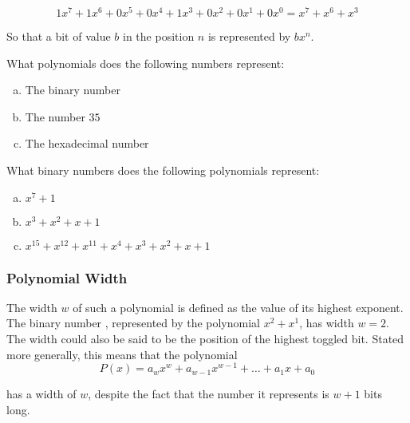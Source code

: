 \begin{equation*}
  1x^7 + 1x^6 + 0x^5 + 0x^4 + 1x^3 + 0x^2 + 0x^1 + 0x^0 = x^7 + x^6 + x^3
\end{equation*}

So that a bit of value $b$ in the position $n$ is represented by
$bx^n$.

\begin{Exercise}[label={bin-to-poly}]

  What polynomials does the following numbers represent:

  \begin{enumerate}[(a)]
  \item The binary number 
  \item The number $35$
  \item The hexadecimal number 
  \end{enumerate}

\end{Exercise}

\begin{Exercise}[label={poly-to-bin}]

  What binary numbers does the following polynomials represent:

  \begin{enumerate}[(a)]
  \item $x^7 + 1$
  \item $x^3 + x^2 + x + 1$
  \item $x^{15} + x^{12} + x^{11} + x^4 + x^3 + x^2 + x + 1$
  \end{enumerate}

\end{Exercise}

\subsubsection{Polynomial Width}

The width $w$ of such a polynomial is defined as the value of its
highest exponent. The binary number , represented by the
polynomial $x^2 + x^1$, has width $w=2$. The width could also be said to
be the position of the highest toggled bit. Stated more generally,
this means that the polynomial
\begin{equation*}
  P(x) = a_wx^w + a_{w-1}x^{w-1} + \dots + a_{1}x + a_{0}
\end{equation*}

has a width of $w$, despite the fact that the number it represents is
$w + 1$ bits long.

